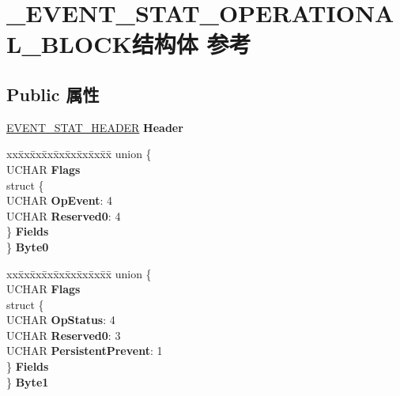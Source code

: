 \hypertarget{struct___e_v_e_n_t___s_t_a_t___o_p_e_r_a_t_i_o_n_a_l___b_l_o_c_k}{}\section{\+\_\+\+E\+V\+E\+N\+T\+\_\+\+S\+T\+A\+T\+\_\+\+O\+P\+E\+R\+A\+T\+I\+O\+N\+A\+L\+\_\+\+B\+L\+O\+C\+K结构体 参考}
\label{struct___e_v_e_n_t___s_t_a_t___o_p_e_r_a_t_i_o_n_a_l___b_l_o_c_k}
\subsection*{Public 属性}
\begin{DoxyCompactItemize}
\item 
\mbox{\label{struct___e_v_e_n_t___s_t_a_t___o_p_e_r_a_t_i_o_n_a_l___b_l_o_c_k_a18c219aa6ac837add37115bf1ebd3f56}} 
\hyperlink{struct___e_v_e_n_t___s_t_a_t___h_e_a_d_e_r}{E\+V\+E\+N\+T\+\_\+\+S\+T\+A\+T\+\_\+\+H\+E\+A\+D\+ER} {\bfseries Header}
\item 
\mbox{\label{struct___e_v_e_n_t___s_t_a_t___o_p_e_r_a_t_i_o_n_a_l___b_l_o_c_k_a1cd4e7dc52cafeca82a0c95bd214a50f}} 
\begin{tabbing}
xx\=xx\=xx\=xx\=xx\=xx\=xx\=xx\=xx\=\kill
union \{\\
\>UCHAR {\bfseries Flags}\\
\>struct \{\\
\>\>UCHAR {\bfseries OpEvent}: 4\\
\>\>UCHAR {\bfseries Reserved0}: 4\\
\>\} {\bfseries Fields}\\
\} {\bfseries Byte0}\\

\end{tabbing}\item 
\mbox{\label{struct___e_v_e_n_t___s_t_a_t___o_p_e_r_a_t_i_o_n_a_l___b_l_o_c_k_ace76dd95e3984400d59fef3353e7700e}} 
\begin{tabbing}
xx\=xx\=xx\=xx\=xx\=xx\=xx\=xx\=xx\=\kill
union \{\\
\>UCHAR {\bfseries Flags}\\
\>struct \{\\
\>\>UCHAR {\bfseries OpStatus}: 4\\
\>\>UCHAR {\bfseries Reserved0}: 3\\
\>\>UCHAR {\bfseries PersistentPrevent}: 1\\
\>\} {\bfseries Fields}\\
\} {\bfseries Byte1}\\


\end{tabbing}
\end{DoxyCompactItemize}

